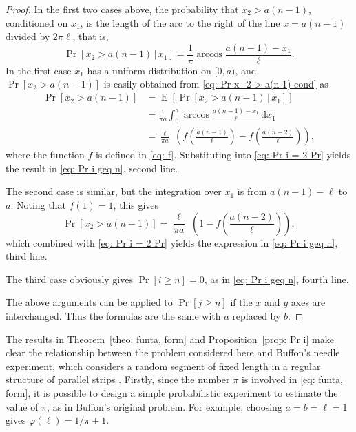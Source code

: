 \documentclass[12pt, a4paper]{article}
\newcommand{\cond}{\,|\,} %
\newcommand{\diff}{\mathrm d}
\DeclareMathOperator{\E}{E}
\newcommand{\funta}{\varphi} %
\newcommand{\len}{\ell} %
\begin{document}
\begin{proof}
In the first two cases above, the probability that $x_2 > a(n-1)$, conditioned on $x_1$, is the length of the arc to the right of the line $x=a(n-1)$ divided by $2\pi\len$, that is,
\begin{equation}
\label{eq: Pr x_2 > a(n-1) cond}
\Pr[x_2 > a(n-1) \cond x_1] = \frac 1 \pi \arccos \frac{a(n-1)-x_1}{\len}.
\end{equation}
In the first case $x_1$ has a uniform distribution on $[0,a)$, and $\Pr[x_2 > a(n-1)]$ is easily obtained from \eqref{eq: Pr x_2 > a(n-1) cond} as
\begin{equation}
\label{eq: Pr x_2 > a(n-1), first case}
\begin{split}
\Pr[x_2 > a(n-1)] &= \E[\Pr[x_2 > a(n-1) \cond x_1]] \\
&= \frac 1 {\pi a} \int_0^a\arccos \frac{a(n-1)-x_1}{\len} \, \diff x_1 \\
&= \frac{\len}{\pi a}\,\, \left( f\left( \frac{a(n-1)}{\len} \right) - f\left( \frac{a(n-2)}{\len} \right) \right),
\end{split}
\end{equation}
where the function $f$ is defined in \eqref{eq: f}. Substituting into \eqref{eq: Pr i = 2 Pr} yields the result in \eqref{eq: Pr i geq n}, second line.

The second case is similar, but the integration over $x_1$ is from $a(n-1)-\len$ to $a$. Noting that $f(1)=1$, this gives
\begin{equation}
\label{eq: Pr x_2 > a(n-1), second case}
\Pr[x_2 > a(n-1)] = \frac{\len}{\pi a}\,\, \left( 1 - f\left( \frac{a(n-2)}{\len} \right) \right),
\end{equation}
which combined with \eqref{eq: Pr i = 2 Pr} yields the expression in \eqref{eq: Pr i geq n}, third line.

The third case obviously gives $\Pr[i \geq n] = 0$, as in \eqref{eq: Pr i geq n}, fourth line.

The above arguments can be applied to $\Pr[j \geq n]$ if the $x$ and $y$ axes are interchanged. Thus the formulas are the same with $a$ replaced by $b$.
\end{proof}

The results in Theorem~\ref{theo: funta, form} and Proposition~\ref{prop: Pr i} make clear the relationship between the problem considered here and Buffon's needle experiment, which considers a random segment of fixed length in a regular structure of parallel strips \cite[section~1.1]{Mathai99}. Firstly, since the number $\pi$ is involved in \eqref{eq: funta, form}, it is possible to design a simple probabilistic experiment to estimate the value of $\pi$, as in Buffon's original problem. For example, choosing $a=b=\len=1$ gives $\funta(\len) = 1/\pi+1$.
\end{document}
